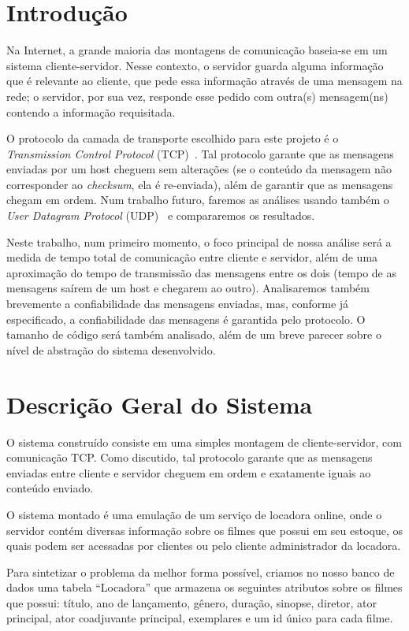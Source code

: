 \documentclass[12pt,a4paper]{article}
\begin{document}
\section{Introdução}
Na Internet, a grande maioria das montagens de comunicação baseia-se em um sistema cliente-servidor. Nesse contexto, o servidor guarda alguma informação que é relevante ao cliente, que pede essa informação através de uma mensagem na rede; o servidor, por sua vez, responde esse pedido com outra(s) mensagem(ns) contendo a informação requisitada.

O protocolo da camada de transporte escolhido para este projeto é o {\it Transmission Control Protocol} (TCP)~\cite{postel1981transmission}. Tal protocolo garante que as mensagens enviadas por um host cheguem sem alterações (se o conteúdo da mensagem não corresponder ao {\it checksum}, ela é re-enviada), além de garantir que as mensagens chegam em ordem. Num trabalho futuro, faremos as análises usando também o {\it User Datagram Protocol} (UDP)~\cite{postel1980user} e compararemos os resultados.

Neste trabalho, num primeiro momento, o foco principal de nossa análise será a medida de tempo total de comunicação entre cliente e servidor, além de uma aproximação do tempo de transmissão das mensagens entre os dois (tempo de as mensagens saírem de um host e chegarem ao outro). Analisaremos também brevemente a confiabilidade das mensagens enviadas, mas, conforme já especificado, a confiabilidade das mensagens é garantida pelo protocolo. O tamanho de código será também analisado, além de um breve parecer sobre o nível de abstração do sistema desenvolvido.

\section{Descrição Geral do Sistema}

O sistema construído consiste em uma simples montagem de cliente-servidor, com comunicação TCP. Como discutido, tal protocolo garante que as mensagens enviadas entre cliente e servidor cheguem em ordem e exatamente iguais ao conteúdo enviado.

    O sistema montado é uma emulação de um serviço de locadora online, onde o servidor contém diversas informação sobre os filmes que possui em seu estoque, os quais podem ser acessadas por clientes ou pelo cliente administrador da locadora. 
    
    Para sintetizar o problema da melhor forma possível, criamos no nosso banco de dados uma tabela “Locadora” que armazena os seguintes atributos sobre os filmes que possui: título, ano de lançamento, gênero, duração, sinopse, diretor, ator principal, ator coadjuvante principal, exemplares e um id único para cada filme. 
    
\end{document}
